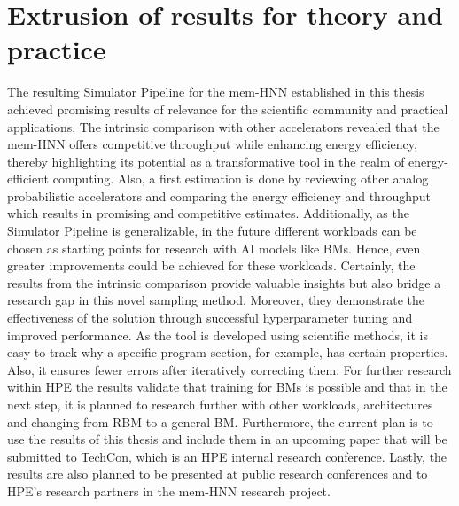 \section{Extrusion of results for theory and practice}
The resulting Simulator Pipeline for the \ac{mem-HNN} established in this thesis achieved 
promising results of relevance for the scientific community and practical applications. 
The intrinsic comparison with other accelerators revealed that the \ac{mem-HNN} offers competitive throughput while enhancing energy efficiency,
thereby highlighting its potential as a transformative tool in the realm of energy-efficient computing.
Also, a first estimation is done by reviewing other analog probabilistic accelerators and comparing the energy efficiency and throughput which results in promising and competitive estimates. 
Additionally, as the Simulator Pipeline is generalizable, in the future different workloads can be chosen as starting points for research with AI models 
like \ac{BM}s. 
Hence, even greater improvements could be achieved for these workloads.
Certainly, the results from the intrinsic comparison provide valuable insights but also bridge a research gap in this novel sampling method.
Moreover, they demonstrate the effectiveness of the solution through successful hyperparameter tuning and improved performance.
As the tool is developed using scientific methods, it is easy to track why a specific program section, for example, has certain properties.
Also, it ensures fewer errors after iteratively correcting them.
For further research within HPE the results validate that training for \ac{BM}s is possible and that in 
the next step, it is planned to research further with other workloads, architectures and changing from \ac{RBM} to a general \ac{BM}.
Furthermore, the current plan is to use the results of this thesis and include them in an upcoming paper 
that will be submitted to TechCon, which is an HPE internal research conference.
Lastly, the results are also planned to be presented at public research conferences and to HPE's research partners in the 
\ac{mem-HNN} research project. 

